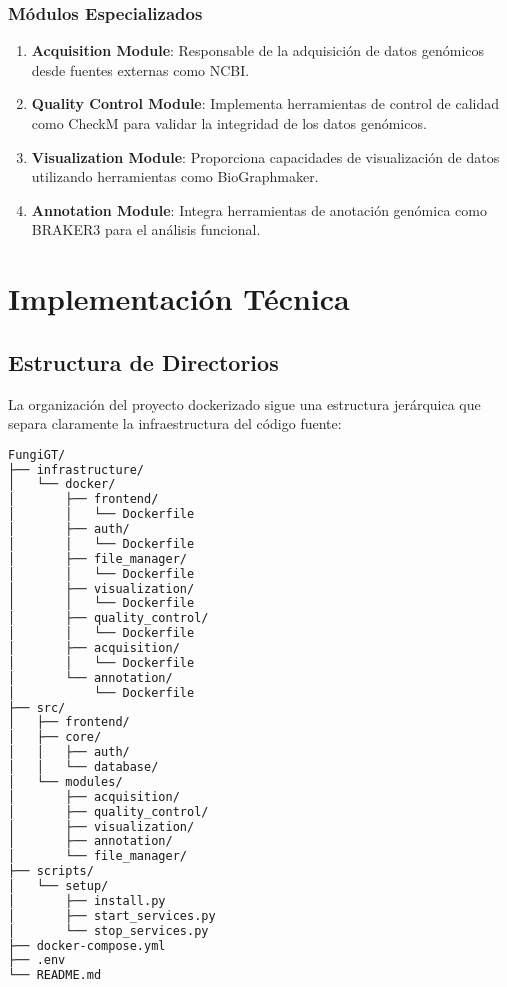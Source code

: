 \documentclass[12pt,a4paper]{article}
\begin{document}
\subsubsection{Módulos Especializados}

\begin{enumerate}
    \item \textbf{Acquisition Module}: Responsable de la adquisición de datos genómicos desde fuentes externas como NCBI.
    
    \item \textbf{Quality Control Module}: Implementa herramientas de control de calidad como CheckM para validar la integridad de los datos genómicos.
    
    \item \textbf{Visualization Module}: Proporciona capacidades de visualización de datos utilizando herramientas como BioGraphmaker.
    
    \item \textbf{Annotation Module}: Integra herramientas de anotación genómica como BRAKER3 para el análisis funcional.
\end{enumerate}

\section{Implementación Técnica}

\subsection{Estructura de Directorios}

La organización del proyecto dockerizado sigue una estructura jerárquica que separa claramente la infraestructura del código fuente:

\begin{lstlisting}[language=bash, caption=Estructura de directorios del proyecto]
FungiGT/
├── infrastructure/
│   └── docker/
│       ├── frontend/
│       │   └── Dockerfile
│       ├── auth/
│       │   └── Dockerfile
│       ├── file_manager/
│       │   └── Dockerfile
│       ├── visualization/
│       │   └── Dockerfile
│       ├── quality_control/
│       │   └── Dockerfile
│       ├── acquisition/
│       │   └── Dockerfile
│       └── annotation/
│           └── Dockerfile
├── src/
│   ├── frontend/
│   ├── core/
│   │   ├── auth/
│   │   └── database/
│   └── modules/
│       ├── acquisition/
│       ├── quality_control/
│       ├── visualization/
│       ├── annotation/
│       └── file_manager/
├── scripts/
│   └── setup/
│       ├── install.py
│       ├── start_services.py
│       └── stop_services.py
├── docker-compose.yml
├── .env
└── README.md
\end{lstlisting}
\end{document}
